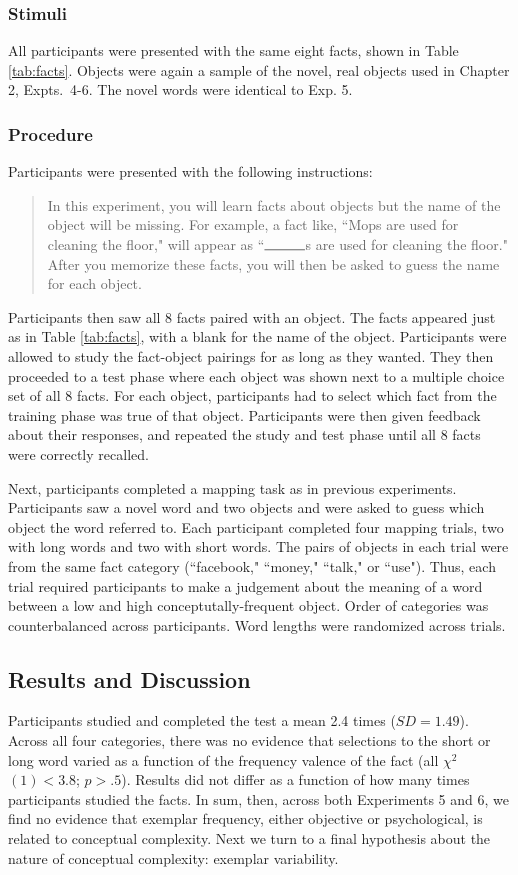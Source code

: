\subsubsection{Stimuli} 
All participants were presented with the same eight facts, shown in Table \ref{tab:facts}. Objects were again a sample of the novel, real objects used in Chapter 2, Expts.\ 4-6.  The novel words were identical to Exp. 5.

\subsubsection{Procedure}
Participants were presented with the following instructions:

\begin{quote}
In this experiment, you will learn facts about objects but the name of the object will be missing. For example, a fact like, ``Mops are used for cleaning the floor," will appear as ``$\rule{1cm}{0.15mm}$s are used for cleaning the floor." After you memorize these facts, you will then be asked to guess the name for each object. 
\end{quote}
Participants  then saw  all 8 facts paired with an object. The facts appeared just as in  Table \ref{tab:facts}, with a blank for the name of the object. Participants were allowed to study the fact-object pairings for as long as they wanted. They then proceeded to a test phase where  each object was shown next to a multiple choice set of all 8 facts. For each object, participants had to select which fact from the training phase was true of that object. Participants were then given feedback about their responses, and repeated the study and test phase until all 8 facts were correctly recalled. 

Next, participants completed a mapping task as in previous experiments. Participants saw a novel word and two objects and were asked to guess which object the word referred to. Each participant completed four mapping trials, two with long words and two with short words. The pairs of objects in each trial were from the same fact category (``facebook," ``money," ``talk," or ``use"). Thus, each trial required participants to make a judgement about the meaning of a word between a low  and high conceptutally-frequent object. Order of categories was counterbalanced across participants. Word lengths were randomized across trials. 

\subsection{Results and Discussion}
Participants studied and completed the test a mean 2.4 times ($SD = 1.49$).  Across all four categories, there was no evidence that selections to the short or long word varied as a function of the frequency valence of the fact (all ${\chi}^2$$(1) < 3.8$; $p > .5$). Results did not differ as a function of how many times participants studied the facts. In sum, then, across both Experiments 5 and 6, we find no evidence that exemplar frequency, either objective  or psychological, is related to conceptual complexity. Next we turn to a final hypothesis about the nature of conceptual complexity: exemplar variability.

